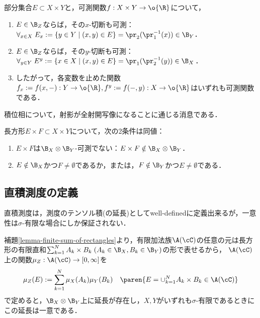 \documentclass[uplatex, dvipdfmx]{jsreport}
\begin{document}
\begin{lemma}
    部分集合$E\subset X\times Y$と，可測関数$f:X\times Y\to\o{\R}$について，
    \begin{enumerate}
        \item $E\in\B_Z$ならば，その$x$-切断も可測：$\forall_{x\in X}\;E_x:=\{y\in Y\mid (x,y)\in E\}=\pr_2(\pr_1^{-1}(x))\in\B_Y$．
        \item $E\in\B_Z$ならば，その$y$-切断も可測：$\forall_{y\in Y}\;E^y:=\{x\in X\mid (x,y)\in E\}=\pr_1(\pr_2^{-1}(y))\in\B_X$．
        \item したがって，各変数を止めた関数$f_x:=f(x,-):Y\to\o{\R},f^y:=f(-,y):X\to\o{\R}$はいずれも可測関数である．
    \end{enumerate}
\end{lemma}
\begin{remarks}
    積位相について，射影が全射開写像になることに通じる消息である．
\end{remarks}

\begin{corollary}
    長方形$E\times F\subset X\times Y$について，次の2条件は同値：
    \begin{enumerate}
        \item $E\times F$は$\B_X\otimes\B_Y$-可測でない：$E\times F\notin\B_X\otimes\B_Y$．
        \item $E\notin\B_X$かつ$F\ne\emptyset$であるか，または，$F\notin\B_Y$かつ$E\ne\emptyset$である．
    \end{enumerate}
\end{corollary}

\subsection{直積測度の定義}

\begin{tcolorbox}[colframe=ForestGreen, colback=ForestGreen!10!white,breakable,colbacktitle=ForestGreen!40!white,coltitle=black,fonttitle=\bfseries\sffamily,
title=]
    直積測度は，測度のテンソル積(の延長)としてwell-definedに定義出来るが，一意性は$\sigma$-有限な場合にしか保証されない．
\end{tcolorbox}

\begin{definition}
    補題\ref{lemma-finite-sum-of-rectangles}より，有限加法族$\A(\cC)$の任意の元は長方形の有限直和$\sum_{k=1}^NA_k\times B_k\;(A_k\in\B_X,B_k\in\B_Y)$の形で表せるから，
    $\A(\cC)$上の関数$\mu_Z:\A(\cC)\to[0,\infty]$を\[\mu_Z(E):=\sum_{k=1}^N\mu_X(A_k)\mu_Y(B_k)\quad\paren{E=\cup_{k=1}^NA_k\times B_k\in\A(\cC)}\]
    で定めると，$\B_X\otimes\B_Y$上に延長が存在し，$X,Y$がいずれも$\sigma$-有限であるときにこの延長は一意である．
\end{definition}
\end{document}
